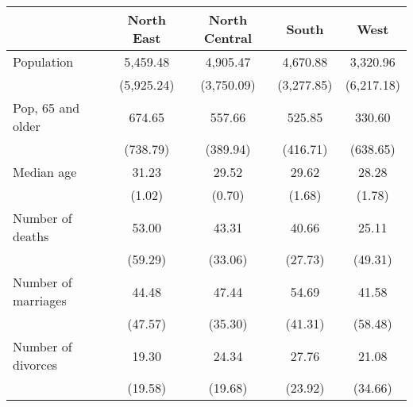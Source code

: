 \begin{tabular}{l*{4}{c}}
\toprule
                &North East&North Central&    South&     West\\
\midrule
Population      & 5,459.48& 4,905.47& 4,670.88& 3,320.96\\
                &(5,925.24)&(3,750.09)&(3,277.85)&(6,217.18)\\
\addlinespace
Pop, 65 and older&   674.65&   557.66&   525.85&   330.60\\
                & (738.79)& (389.94)& (416.71)& (638.65)\\
\addlinespace
Median age      &    31.23&    29.52&    29.62&    28.28\\
                &   (1.02)&   (0.70)&   (1.68)&   (1.78)\\
\addlinespace
Number of deaths&    53.00&    43.31&    40.66&    25.11\\
                &  (59.29)&  (33.06)&  (27.73)&  (49.31)\\
\addlinespace
Number of marriages&    44.48&    47.44&    54.69&    41.58\\
                &  (47.57)&  (35.30)&  (41.31)&  (58.48)\\
\addlinespace
Number of divorces&    19.30&    24.34&    27.76&    21.08\\
                &  (19.58)&  (19.68)&  (23.92)&  (34.66)\\
\bottomrule
\end{tabular}
